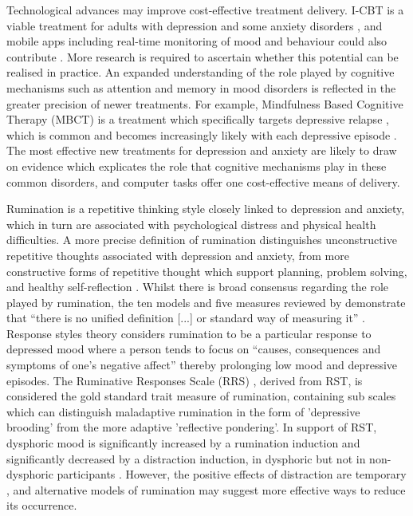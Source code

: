 \documentclass[man,floatsintext,a4paper,biblatex]{apa6}\usepackage[]{graphicx}\usepackage[]{color}
\begin{document}
\raggedbottom

Technological advances may improve cost-effective treatment
delivery. I-CBT is a viable treatment for adults with depression and
some anxiety disorders \parencite{arnberg_internetdelivered_2014},
and mobile apps including real-time monitoring of mood and behaviour
could also contribute \parencite{cuijpers_psychotherapies_2015}. More
research is required to ascertain whether this potential can be realised
in practice.  An expanded understanding of the role played by cognitive
mechanisms such as attention and memory in mood disorders is reflected
in the greater precision of newer treatments. For example, Mindfulness
Based Cognitive Therapy (MBCT) is a treatment which specifically
targets depressive relapse \parencite{segal_mindfulnessbased_2012},
which is common and becomes increasingly likely with each depressive
episode \parencite{haliwell_fundamental_2007}. The most effective new
treatments for depression and anxiety are likely to draw on evidence
which explicates the role that cognitive mechanisms play in these common
disorders, and computer tasks offer one cost-effective means of delivery.

Rumination is a repetitive thinking style closely linked to depression
and anxiety, which in turn are associated with psychological distress and
physical health difficulties. A more precise definition of rumination
distinguishes unconstructive repetitive thoughts associated with
depression and anxiety, from more constructive forms of repetitive
thought which support planning, problem solving, and healthy
self-reflection \parencite{watkins_constructive_2008}.  Whilst there
is broad consensus regarding the role played by rumination, the ten
models and five measures reviewed by \textcite{smith_roadmap_2009}
demonstrate that ``there is no unified definition [...] or standard way
of measuring it'' \textcite[][p. 117]{smith_roadmap_2009}. Response
styles theory \parencite[RST; ][]{nolen-hoeksema_responses_1991}
considers rumination to be a particular response to depressed mood
where a person tends to focus on ``causes, consequences and symptoms
of one's negative affect'' \parencite[][p. 117]{smith_roadmap_2009}
thereby prolonging low mood and depressive episodes. The Ruminative
Responses Scale (RRS) \parencite{treynor_rumination_2003}, derived
from RST, is considered the gold standard trait measure of rumination,
containing sub scales which can distinguish maladaptive rumination in
the form of 'depressive brooding' from the more adaptive 'reflective
pondering'. In support of RST, dysphoric mood is significantly
increased by a rumination induction and significantly decreased by a
distraction induction, in dysphoric but not in non-dysphoric participants
\parencite{nolen-hoeksema_rethinking_2008}.  However, the positive effects
of distraction are temporary \parencite{nolen-hoeksema_rethinking_2008},
and alternative models of rumination may suggest more effective ways to
reduce its occurrence.
\end{document}
